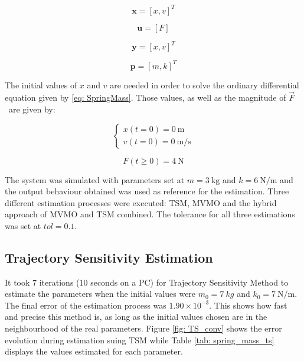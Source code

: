 \begin{equation}
	\mathbf{x} = [x, v]^{T}
	\label{eq: spring_mass_x}
\end{equation}

\begin{equation}
	\mathbf{u} = [F]
	\label{eq: spring_mass_u}
\end{equation}

\begin{equation}
	\mathbf{y} = [x,v]^{T}
	\label{eq: spring_mass_y}
\end{equation}

\begin{equation}
	\mathbf{p} = [m, k]^{T}
	\label{eq: spring_mass_p}
\end{equation}

The initial values of $x$ and $v$ are needed in order to solve the ordinary differential equation given by \eqref{eq: SpringMass}. Those values, as well as the magnitude of $\vec{F}$\ are given by:

\begin{equation}
	\begin{cases}
		x(t=0) = 0\ \text{m}\\
		v(t=0) = 0\ \text{m/s}
	\end{cases}
\end{equation}

\begin{equation}
	F(t\geq 0) = 4\ \text{N}
\end{equation}

The system was simulated with parameters set at $m = 3\ \text{kg}$ and $k = 6\ \text{N/m}$ and the output behaviour obtained was used as reference for the estimation. Three different estimation processes were executed: TSM, MVMO and the hybrid approach of MVMO and TSM combined. The tolerance for all three estimations was set at $tol = 0.1$.

\subsection{Trajectory Sensitivity Estimation}

It took 7 iterations (10 seconds on a PC) for Trajectory Sensitivity Method to estimate the parameters when the initial values were $m_{0} = 7\ kg$ and $k_{0} = 7\ \text{N/m}$. The final error of the estimation process was $1.90\times 10^{-3}$. This shows how fast and precise this method is, as long as the initial values chosen are in the neighbourhood of the real parameters. Figure \ref{fig: TS_conv} shows the error evolution during estimation suing TSM while Table \ref{tab: spring_mass_ts} displays the values estimated for each parameter.

